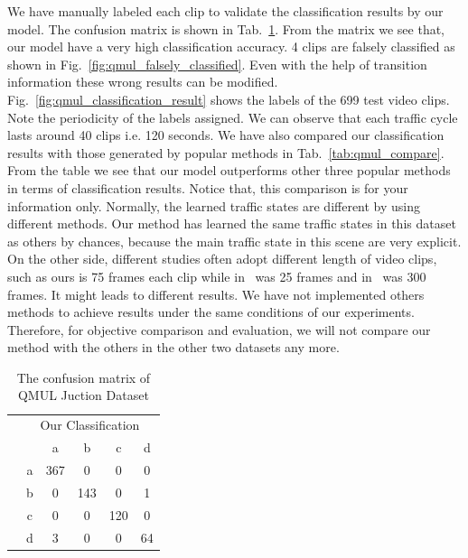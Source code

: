 We have manually labeled each clip to validate the classification results by our model. The confusion matrix is shown in Tab.~\ref{tab:qmul_confuse}. From the matrix we see that, our model have a very high classification accuracy. 4 clips are falsely classified as shown in Fig.~\ref{fig:qmul_falsely_classified}. Even with the help of transition information these wrong results can be modified. Fig.~\ref{fig:qmul_classification_result} shows the labels of the 699 test video clips. Note the periodicity of the labels assigned. We can observe that each traffic cycle lasts around 40 clips i.e. 120 seconds.
We have also compared our classification results with those generated by popular methods in Tab.~\ref{tab:qmul_compare}. From the table we see that our model outperforms other three popular methods in terms of classification results. 
Notice that, this comparison is for your information only. 
Normally, the learned traffic states are different by using different methods. Our method has learned the same traffic states in this dataset as others by chances, because the main traffic state in this scene are very explicit. On the other side, different studies often adopt different length of video clips, such as ours is 75 frames each clip while in~\cite{hospedales2009markov} was 25 frames and in~\cite{wang2009unsupervised} was 300 frames. It might leads to different results. We have not implemented others methods to achieve results under the same conditions of our experiments.
Therefore, for objective comparison and evaluation, we will not compare our method with the others in the other two datasets any more.
\begin{table}[!htbp]
	\begin{center}
		\renewcommand\arraystretch{2}
		\setlength{\tabcolsep}{8pt}
		\begin{tabular}{c c|c|c|c|c|}
			\multicolumn{1}{c}{ }	& \multicolumn{5}{c}{Our Classification }\\
			\multirow{5}{5pt}{\rotatebox{90}{Manually label}}		&\multicolumn{1}{c}{ }	&\multicolumn{1}{c}{a}	&\multicolumn{1}{c}{b}	&\multicolumn{1}{c}{c}	&\multicolumn{1}{c}{d}\\
			\cline{3-6}
			&a		&367	&0	&0	&0\\
			\cline{3-6}
			&b		&0	&143	&0	&1\\
			\cline{3-6}
			&c		&0	&0	&120	&0\\
			\cline{3-6}
			&d		&3	&0		&0	&64\\
			\cline{3-6}
		\end{tabular}
	\end{center}
	\caption[The confusion matrix of QMUL Juction Dataset]
	{The confusion matrix of QMUL Juction Dataset}
	\label{tab:qmul_confuse} 
\end{table}


